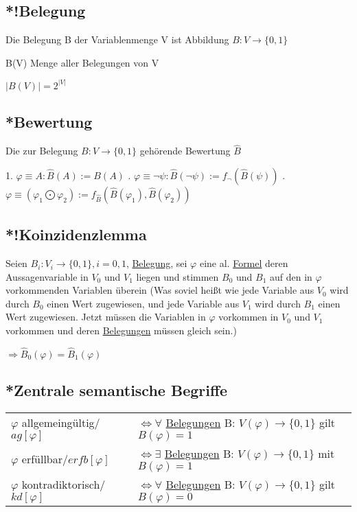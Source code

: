 \documentclass[12pt,a4paper]{article} %
\begin{document}
	\subsection{*!Belegung}
	\label{Belegung}
	Die Belegung B der Variablenmenge V ist Abbildung $B: V \rightarrow \{0, 1\}$
	
	B(V) Menge aller Belegungen von V
	
	$|B(V)| = 2^{|V|}$
	
	\subsection{*Bewertung}
	Die zur Belegung $B: V \rightarrow \{0, 1\}$ gehörende Bewertung $\widehat{B}$ 
	
	1. $\varphi \equiv A : \widehat{B}(A) := B(A)$ . $\varphi \equiv \neg \psi : \widehat{B}(\neg \psi):= f_{\neg}(\widehat{B}(\psi))$ . $\varphi \equiv (\varphi_1 \bigodot \varphi_2) := f_{\widehat{B}}(\widehat{B}(\varphi_1), \widehat{B}(\varphi_2))$
	
	\subsection{*!Koinzidenzlemma}
	Seien $B_i : V_i \rightarrow \{0, 1\}, i = 0, 1$, \hyperref[Belegung]{Belegung}, sei $\varphi$ eine al. \hyperref[Formel]{Formel} deren Aussagenvariable in $V_0$ und $V_1$ liegen und stimmen $B_0$ und $B_1$ auf den in $\varphi$ vorkommenden Variablen überein (Was soviel heißt wie jede Variable aus $V_0$ wird durch $B_0$ einen Wert zugewiesen, und jede Variable aus $V_1$ wird durch $B_1$ einen Wert zugewiesen. Jetzt müssen die Variablen in $\varphi$ vorkommen in $V_0$ und $V_1$ vorkommen und deren \hyperref[Belegung]{Belegungen} müssen gleich sein.)
	
	$\Rightarrow \widehat{B}_0(\varphi) = \widehat{B}_1(\varphi)$
	
	\subsection{*Zentrale semantische Begriffe}
	\begin{tabular}{l l}
		$\varphi$ allgemeingültig/$ag[\varphi]$ & $\Leftrightarrow \forall$ \hyperref[Belegung]{Belegungen} B: $V(\varphi) \rightarrow \{0, 1\}$ gilt $B(\varphi) = 1$ \\
		$\varphi$ erfüllbar/$erfb[\varphi]$ & $\Leftrightarrow \exists$ \hyperref[Belegung]{Belegungen} B: $V(\varphi) \rightarrow \{0, 1\}$ mit $B(\varphi) = 1$ \\
		$\varphi$ kontradiktorisch/$kd[\varphi]$ & $\Leftrightarrow \forall$ \hyperref[Belegung]{Belegungen} B: $V(\varphi) \rightarrow \{0, 1\}$ gilt $B(\varphi) = 0$ 
	\end{tabular}
	
\end{document}
